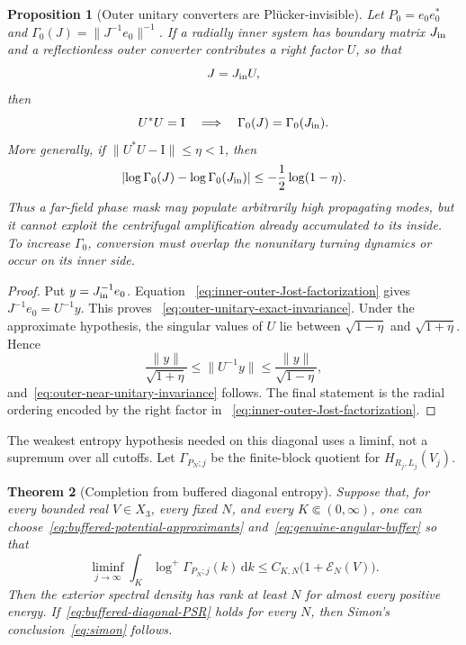 \documentclass[11pt]{article}
\newcommand{\Id}{\mathrm I}
\newcommand{\dd}{\,\mathrm d}
\newtheorem{theorem}{Theorem}[section]
\newtheorem{proposition}[theorem]{Proposition}
\theoremstyle{definition}
\theoremstyle{remark}
\begin{document}
\begin{proposition}[Outer unitary converters are Pl\"ucker-invisible]
\label{prop:outer-unitary-plucker-invisible}
Let $P_0=e_0e_0^*$ and
$\Gamma_0(J)=\|J^{-1}e_0\|^{-1}$.  If a radially inner system has boundary
matrix $J_{\rm in}$ and a reflectionless outer converter contributes a right
factor $U$, so that
\begin{equation}
 J=J_{\rm in}U,
 \label{eq:inner-outer-Jost-factorization}
\end{equation}
then
\begin{equation}
 U^*U=\Id
 \quad\Longrightarrow\quad
 \Gamma_0(J)=\Gamma_0(J_{\rm in}).
 \label{eq:outer-unitary-exact-invariance}
\end{equation}
More generally, if
$\|U^*U-\Id\|\leq\eta<1$, then
\begin{equation}
 \left|\log\Gamma_0(J)-\log\Gamma_0(J_{\rm in})\right|
 \leq-\frac12\log(1-\eta).
 \label{eq:outer-near-unitary-invariance}
\end{equation}
Thus a far-field phase mask may populate arbitrarily high propagating modes,
but it cannot exploit the centrifugal amplification already accumulated to
its inside.  To increase $\Gamma_0$, conversion must overlap the nonunitary
turning dynamics or occur on its inner side.
\end{proposition}

\begin{proof}
Put $y=J_{\rm in}^{-1}e_0$.  Equation
~\eqref{eq:inner-outer-Jost-factorization} gives
$J^{-1}e_0=U^{-1}y$.  This proves
~\eqref{eq:outer-unitary-exact-invariance}.  Under the approximate hypothesis,
the singular values of $U$ lie between $\sqrt{1-\eta}$ and
$\sqrt{1+\eta}$.  Hence
\begin{equation}
 \frac{\|y\|}{\sqrt{1+\eta}}
 \leq\|U^{-1}y\|
 \leq\frac{\|y\|}{\sqrt{1-\eta}},
\end{equation}
and~\eqref{eq:outer-near-unitary-invariance} follows.  The final statement is
the radial ordering encoded by the right factor in
~\eqref{eq:inner-outer-Jost-factorization}.
\end{proof}

The weakest entropy hypothesis needed on this diagonal uses a liminf, not a
supremum over all cutoffs.  Let $\Gamma_{P_N;j}$ be the finite-block quotient
for $H_{R_j,L_j}(V_j)$.

\begin{theorem}[Completion from buffered diagonal entropy]
\label{thm:buffered-diagonal-completion}
Suppose that, for every bounded real $V\in X_3$, every fixed $N$, and every
$K\Subset(0,\infty)$, one can choose~\eqref{eq:buffered-potential-approximants}
and~\eqref{eq:genuine-angular-buffer} so that
\begin{equation}
 \liminf_{j\to\infty}\int_K
       \log^+\Gamma_{P_N;j}(k)\dd k
 \leq C_{K,N}\bigl(1+\mathcal E_N(V)\bigr).
 \label{eq:buffered-diagonal-PSR}
\end{equation}
Then the exterior spectral density has rank at least $N$ for almost every
positive energy.  If~\eqref{eq:buffered-diagonal-PSR} holds for every $N$, then
Simon's conclusion~\eqref{eq:simon} follows.
\end{theorem}
\end{document}
